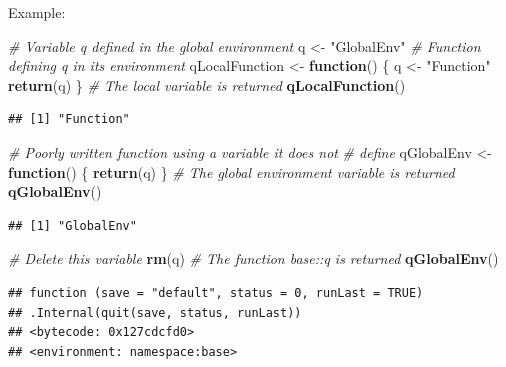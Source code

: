 \documentclass[
  12pt,
  american,
  a4paper,
  extrafontsizes,onecolumn,openright
  ]{memoir}
\newenvironment{Shaded}{\begin{snugshade}}{\end{snugshade}}
\newcommand{\CommentTok}[1]{\textcolor[rgb]{0.56,0.35,0.01}{\textit{#1}}}
\newcommand{\ControlFlowTok}[1]{\textcolor[rgb]{0.13,0.29,0.53}{\textbf{#1}}}
\newcommand{\FunctionTok}[1]{\textcolor[rgb]{0.13,0.29,0.53}{\textbf{#1}}}
\newcommand{\NormalTok}[1]{#1}
\newcommand{\OtherTok}[1]{\textcolor[rgb]{0.56,0.35,0.01}{#1}}
\newcommand{\StringTok}[1]{\textcolor[rgb]{0.31,0.60,0.02}{#1}}
\begin{document}
Example:

\scriptsize

\begin{Shaded}
\begin{Highlighting}[]
\CommentTok{\# Variable q defined in the global environment}
\NormalTok{q }\OtherTok{\textless{}{-}} \StringTok{"GlobalEnv"}
\CommentTok{\# Function defining q in its environment}
\NormalTok{qLocalFunction }\OtherTok{\textless{}{-}} \ControlFlowTok{function}\NormalTok{() \{}
\NormalTok{    q }\OtherTok{\textless{}{-}} \StringTok{"Function"}
    \FunctionTok{return}\NormalTok{(q)}
\NormalTok{\}}
\CommentTok{\# The local variable is returned}
\FunctionTok{qLocalFunction}\NormalTok{()}
\end{Highlighting}
\end{Shaded}

\begin{verbatim}
## [1] "Function"
\end{verbatim}

\begin{Shaded}
\begin{Highlighting}[]
\CommentTok{\# Poorly written function using a variable it does not}
\CommentTok{\# define}
\NormalTok{qGlobalEnv }\OtherTok{\textless{}{-}} \ControlFlowTok{function}\NormalTok{() \{}
    \FunctionTok{return}\NormalTok{(q)}
\NormalTok{\}}
\CommentTok{\# The global environment variable is returned}
\FunctionTok{qGlobalEnv}\NormalTok{()}
\end{Highlighting}
\end{Shaded}

\begin{verbatim}
## [1] "GlobalEnv"
\end{verbatim}

\begin{Shaded}
\begin{Highlighting}[]
\CommentTok{\# Delete this variable}
\FunctionTok{rm}\NormalTok{(q)}
\CommentTok{\# The function base::q is returned}
\FunctionTok{qGlobalEnv}\NormalTok{()}
\end{Highlighting}
\end{Shaded}

\begin{verbatim}
## function (save = "default", status = 0, runLast = TRUE) 
## .Internal(quit(save, status, runLast))
## <bytecode: 0x127cdcfd0>
## <environment: namespace:base>
\end{verbatim}

\normalsize
\end{document}
